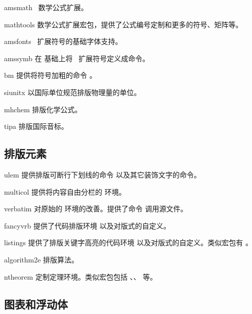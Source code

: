 \begin{pkglist}
  \item[amsmath]  \AmS\ 数学公式扩展。
  \item[mathtools] 数学公式扩展宏包，提供了公式编号定制和更多的符号、矩阵等。
  \item[amsfonts] \AmS\ 扩展符号的基础字体支持。
  \item[amssymb]  在  基础上将 \AmS\ 扩展符号定义成命令。
  \item[bm]       提供将符号加粗的命令 。
  \item[siunitx]  以国际单位规范排版物理量的单位。
  \item[mhchem]   排版化学公式。
  \item[tipa]     排版国际音标。
\end{pkglist}

\subsection{排版元素}\label{subsec:pkg-elements}

\begin{pkglist}
  \item[ulem]     提供排版可断行下划线的命令  以及其它装饰文字的命令。
  \item[multicol] 提供将内容自由分栏的  环境。
  \item[verbatim] 对原始的  环境的改善。提供了命令  调用源文件。
  \item[fancyvrb] 提供了代码排版环境  以及对版式的自定义。
  \item[listings] 提供了排版关键字高亮的代码环境  以及对版式的自定义。类似宏包有 。
  \item[algorithm2e] 排版算法。
  \item[ntheorem] 定制定理环境。类似宏包包括 、、 等。
\end{pkglist}

\subsection{图表和浮动体}\label{subsec:pkg-tab-fig}

